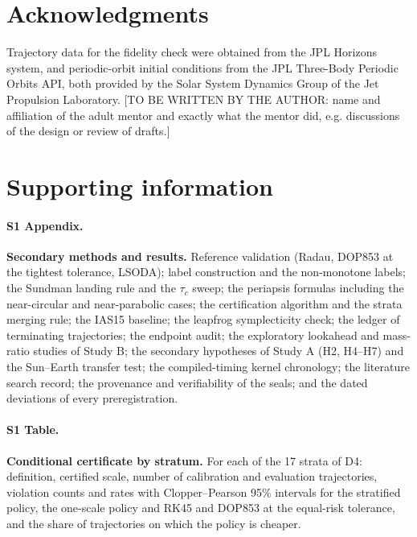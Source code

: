 \documentclass[10pt,letterpaper]{article}
\begin{document}
\section*{Acknowledgments}
Trajectory data for the fidelity check were obtained from the JPL Horizons system, and periodic-orbit initial conditions from the JPL Three-Body Periodic Orbits API, both provided by the Solar System Dynamics Group of the Jet Propulsion Laboratory. [TO BE WRITTEN BY THE AUTHOR: name and affiliation of the adult mentor and exactly what the mentor did, e.g. discussions of the design or review of drafts.]

\nolinenumbers



\section*{Supporting information}

\paragraph*{S1 Appendix.}
\label{S1_Appendix}
{\bf Secondary methods and results.} Reference validation (Radau, DOP853 at the tightest tolerance, LSODA); label construction and the non-monotone labels; the Sundman landing rule and the $\tau_{c}$ sweep; the periapsis formulas including the near-circular and near-parabolic cases; the certification algorithm and the strata merging rule; the IAS15 baseline; the leapfrog symplecticity check; the ledger of terminating trajectories; the endpoint audit; the exploratory lookahead and mass-ratio studies of Study B; the secondary hypotheses of Study A (H2, H4--H7) and the Sun--Earth transfer test; the compiled-timing kernel chronology; the literature search record; the provenance and verifiability of the seals; and the dated deviations of every preregistration.

\paragraph*{S1 Table.}
\label{S1_Table}
{\bf Conditional certificate by stratum.} For each of the 17 strata of D4: definition, certified scale, number of calibration and evaluation trajectories, violation counts and rates with Clopper--Pearson 95\% intervals for the stratified policy, the one-scale policy and RK45 and DOP853 at the equal-risk tolerance, and the share of trajectories on which the policy is cheaper.
\end{document}

